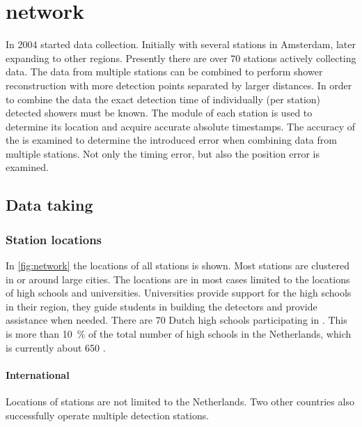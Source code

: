 \chapter{\hisparc network}
\label{ch:cluster}

In 2004 \hisparc started data collection. Initially with several stations in Amsterdam, later expanding to other regions. Presently there are over \num{70} \hisparc stations actively collecting data. The data from multiple \hisparc stations can be combined to perform shower reconstruction with more detection points separated by larger distances. In order to combine the data the exact detection time of individually (per station) detected showers must be known. The \gps module of each station is used to determine its location and acquire accurate absolute timestamps. The accuracy of the \gps is examined to determine the introduced error when combining data from multiple stations. Not only the timing error, but also the position error is examined.


\section{Data taking}


\subsection{Station locations}

In \cref{fig:network} the locations of all \hisparc stations is shown. Most stations are clustered in or around large cities. The locations are in most cases limited to the locations of high schools and universities. Universities provide support for the high schools in their region, they guide students in building the detectors and provide assistance when needed. There are \num{70} Dutch high schools participating in \hisparc. This is more than \SI{10}{\percent} of the total number of high schools in the Netherlands, which is currently about \num{650} \cite{duo2016hoofd}.


\subsubsection{International}

Locations of \hisparc stations are not limited to the Netherlands. Two other countries also successfully operate multiple detection stations.

